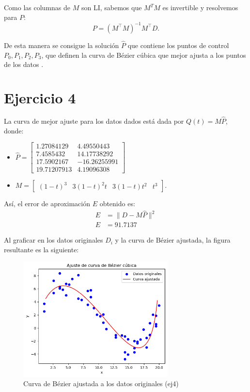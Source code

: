 \documentclass{article}
\begin{document}
Como las columnas de $M$ son LI, sabemos que $M^TM$ es invertible y resolvemos para \( P \):
\[
P = (M^\top M)^{-1} M^\top D.
\]

De esta manera se consigue la solución $\hat P$ que contiene los puntos de control \( P_0, P_1, P_2, P_3 \), que definen la curva de Bézier cúbica que mejor ajusta a los puntos de los datos .

\section*{Ejercicio 4}
La curva de mejor ajuste para los datos dados está dada por $Q(t) = M \hat P$, donde:

\begin{itemize}
    \item $\hat P = 
\begin{bmatrix}
1.27084129 & 4.49550443\\
7.4585432 & 14.17738292\\
17.5902167 & -16.26255991\\
19.71207913 &  4.19096308
\end{bmatrix}$ 

    \item $M =
\begin{bmatrix}
(1 - t)^3 & 3(1 - t)^2 t & 3(1 - t) t^2 & t^3
\end{bmatrix}$.
\end{itemize}

Así, el error de aproximación $E$ obtenido es: 
$$
\begin{aligned}
E &= \|D - M \hat P \|^2 \\
E &= 91.7137
\end{aligned}
$$

Al graficar en los datos originales $D_i$ y la curva de Bézier ajustada, la figura resultante es la siguiente:

\begin{figure}[H]
    \centering
    \includegraphics[width=0.7\textwidth]{Imagenes/ej4.png}
    \caption{Curva de Bézier ajustada a los datos originales (ej4)}
\end{figure}
\end{document}
